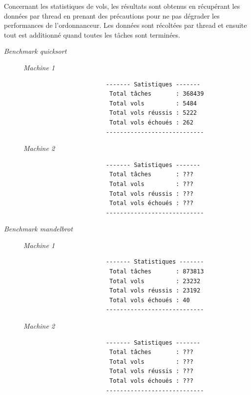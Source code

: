 \documentclass[a4paper]{article}
\def\mone{\textit{Machine 1}} %
\def\mtwo{\textit{Machine 2}} %
\def\bone{\textit{Benchmark quicksort}}
\def\btwo{\textit{Benchmark mandelbrot}}
\begin{document}
Concernant les statistiques de vols, les résultats sont obtenus en récupérant
les données par thread en prenant des précautions pour ne pas dégrader les
performances de l'ordonnanceur. Les données sont récoltées par thread et ensuite
tout est additionné quand toutes les tâches sont terminées.

\begin{description}
  \item[\bone] \hspace{1em}
        \begin{description}
          \item[\mone] \hspace{1em}
                \begin{verbatim}
                  ------- Satistiques -------
                   Total tâches       : 368439
                   Total vols         : 5484
                   Total vols réussis : 5222
                   Total vols échoués : 262
                  ----------------------------
                \end{verbatim}
          \item[\mtwo] \hspace{1em}
                \begin{verbatim}
                  ------- Satistiques -------
                   Total tâches       : ???
                   Total vols         : ???
                   Total vols réussis : ???
                   Total vols échoués : ???
                  ----------------------------
                \end{verbatim}
        \end{description}

  \item[\btwo] \hspace{1em}
        \begin{description}
          \item[\mone] \hspace{1em}
                \begin{verbatim}
                  ------- Statistiques -------
                   Total tâches       : 873813
                   Total vols         : 23232
                   Total vols réussis : 23192
                   Total vols échoués : 40
                  ----------------------------
                \end{verbatim}
          \item[\mtwo] \hspace{1em}
                \begin{verbatim}
                  ------- Satistiques -------
                   Total tâches       : ???
                   Total vols         : ???
                   Total vols réussis : ???
                   Total vols échoués : ???
                  ----------------------------
                \end{verbatim}
        \end{description}
\end{description}
\end{document}
